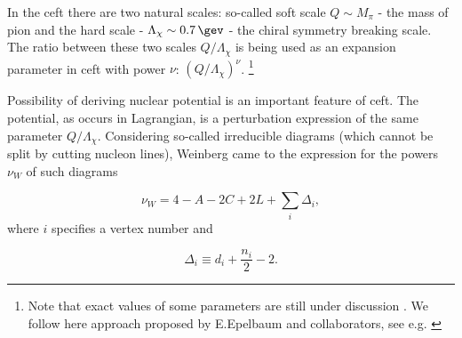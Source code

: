  
In the \gls{ceft} there are two natural scales: so-called soft scale $Q \sim M_\pi$  -
the mass of pion and the hard scale -
$\Lambda_\chi \sim \SI{0.7}{\gev}$ - the chiral symmetry breaking scale.
The ratio between these two scales $Q/\Lambda_\chi$
is being used as an expansion parameter in  \gls{ceft} with power
$\nu$: $\left(Q/\Lambda_\chi\right)^\nu$.
\footnote{Note that exact values of some parameters are still under discussion \cite{Epelbaum2004}. We follow here approach proposed by E.Epelbaum and collaborators, see e.g. \cite{reinkrebs2018}}

Possibility of deriving nuclear potential is an important feature of \gls{ceft}.
The potential, as occurs in Lagrangian, is a perturbation expression of the same parameter $Q/\Lambda_\chi$.
Considering so-called irreducible diagrams (which cannot be split
by cutting nucleon lines), Weinberg \cite{WEINBERG1990,WEINBERG1991}
came to the expression for the powers $\nu_W$ of such diagrams

\begin{equation}
    \nu_W = 4 - A - 2C + 2L + \sum_i \Delta_i,
    \label{powers}
\end{equation}
where $i$ specifies a vertex number and

\begin{equation}
    \Delta_i \equiv d_i + \frac{n_i}{2} - 2.
    \label{Delta}
\end{equation}

